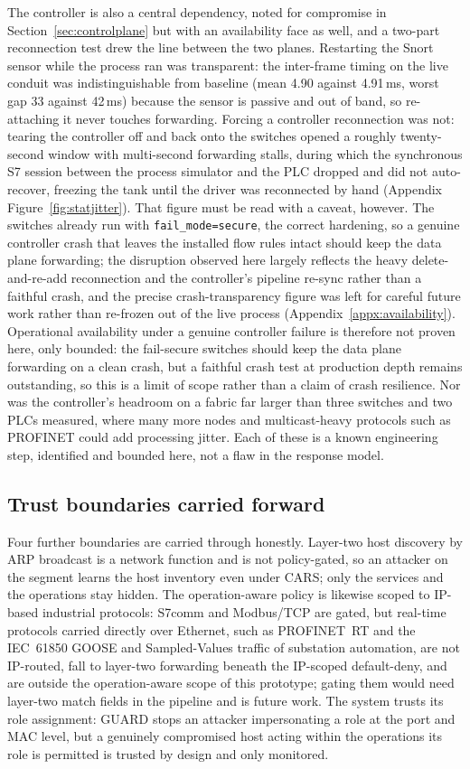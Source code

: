 The controller is also a central dependency, noted for compromise in Section~\ref{sec:controlplane} but with an availability face as well, and a two-part reconnection test drew the line between the two planes. Restarting the Snort sensor while the process ran was transparent: the inter-frame timing on the live conduit was indistinguishable from baseline (mean 4.90 against 4.91\,ms, worst gap 33 against 42\,ms) because the sensor is passive and out of band, so re-attaching it never touches forwarding. Forcing a controller reconnection was not: tearing the controller off and back onto the switches opened a roughly twenty-second window with multi-second forwarding stalls, during which the synchronous S7 session between the process simulator and the PLC dropped and did not auto-recover, freezing the tank until the driver was reconnected by hand (Appendix Figure~\ref{fig:statjitter}). That figure must be read with a caveat, however. The switches already run with \texttt{fail\_mode=secure}, the correct hardening, so a genuine controller crash that leaves the installed flow rules intact should keep the data plane forwarding; the disruption observed here largely reflects the heavy delete-and-re-add reconnection and the controller's pipeline re-sync rather than a faithful crash, and the precise crash-transparency figure was left for careful future work rather than re-frozen out of the live process (Appendix~\ref{appx:availability}). Operational availability under a genuine controller failure is therefore not proven here, only bounded: the fail-secure switches should keep the data plane forwarding on a clean crash, but a faithful crash test at production depth remains outstanding, so this is a limit of scope rather than a claim of crash resilience. Nor was the controller's headroom on a fabric far larger than three switches and two PLCs measured, where many more nodes and multicast-heavy protocols such as PROFINET could add processing jitter. Each of these is a known engineering step, identified and bounded here, not a flaw in the response model.

\subsection{Trust boundaries carried forward}

Four further boundaries are carried through honestly. Layer-two host discovery by ARP broadcast is a network function and is not policy-gated, so an attacker on the segment learns the host inventory even under CARS; only the services and the operations stay hidden. The operation-aware policy is likewise scoped to IP-based industrial protocols: S7comm and Modbus/TCP are gated, but real-time protocols carried directly over Ethernet, such as PROFINET~RT and the IEC~61850 GOOSE and Sampled-Values traffic of substation automation, are not IP-routed, fall to layer-two forwarding beneath the IP-scoped default-deny, and are outside the operation-aware scope of this prototype; gating them would need layer-two match fields in the pipeline and is future work. The system trusts its role assignment: GUARD stops an attacker impersonating a role at the port and MAC level, but a genuinely compromised host acting within the operations its role is permitted is trusted by design and only monitored. 

